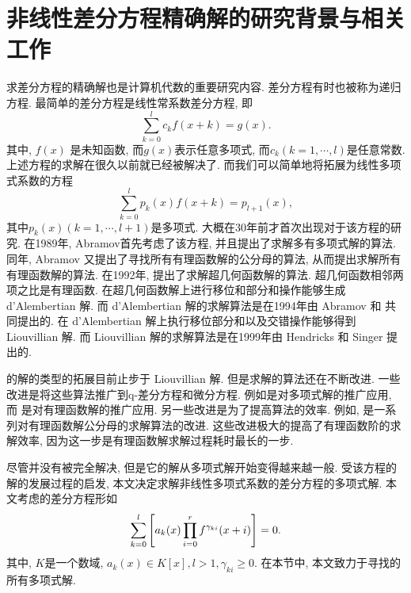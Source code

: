 \section{非线性差分方程精确解的研究背景与相关工作}
求差分方程的精确解也是计算机代数的重要研究内容. 差分方程有时也被称为递归方程. 最简单的差分方程是线性常系数差分方程, 即
\begin{equation}
\sum_{k=0}^l{c_k f(x+k)}=g(x).
\label{ceq}
\end{equation}
其中, $f(x)$ 是未知函数, 而$g(x)$表示任意多项式, 而$c_k (k=1,\cdots,l)$是任意常数. 上述方程的求解在很久以前就已经被解决了. 而我们可以简单地将拓展为线性多项式系数的方程
\begin{equation}
\sum_{k=0}^l{p_k(x)f(x+k)=p_{l+1}(x)},
\label{peq}
\end{equation}
其中$p_k(x) (k=1,\cdots,l+1)$是多项式. 大概在30年前才首次出现对于该方程的研究. 在1989年, Abramov首先考虑了该方程, 并且提出了求解多有多项式解的算法\citep{Abramov1989polynomial}. 同年, Abramov 又提出了寻找所有有理函数解的公分母的算法, 从而提出求解所有有理函数解的算法\citep{Abramov1989rational}. 在1992年, \Petkovsek{} 提出了求解超几何函数解的算法\citep{petkovvsek1992hypergeometric}. 超几何函数相邻两项之比是有理函数. 在超几何函数解上进行移位和部分和操作能够生成 d'Alembertian 解. 而 d'Alembertian 解的求解算法是在1994年由 Abramov 和 \Petkovsek{} 共同提出的\citep{abramov1994dAlembertian}. 在 d'Alembertian 解上执行移位\zdh 部分和以及交错操作能够得到 Liouvillian 解. 而 Liouvillian 解的求解算法是在1999年由 Hendricks 和 Singer 提出的\citep{hendricks1999Liouvillian}.

的解的类型的拓展目前止步于 Liouvillian 解. 但是求解的算法还在不断改进. 一些改进是将这些算法推广到q-差分方程和微分方程. 例如是对多项式解的推广应用, 而 是对有理函数解的推广应用. 另一些改进是为了提高算法的效率. 例如,  是一系列对有理函数解公分母的求解算法的改进. 这些改进极大的提高了有理函数阶的求解效率, 因为这一步是有理函数解求解过程耗时最长的一步. 

尽管并没有被完全解决, 但是它的解从多项式解开始变得越来越一般. 受该方程的解的发展过程的启发, 本文决定求解非线性多项式系数的差分方程的多项式解. 本文考虑的差分方程形如
\begin{equation}
\sum_{k=0}^l{\left[a_k(x)\prod_{i=0}^r{f^{\gamma_{ki}}(x+i)}\right]}=0.
\label{eq}
\end{equation}
其中, $K$是一个数域, $a_k(x)\in K[x], l>1, \gamma_{ki}\ge 0$. 在本节中, 本文致力于寻找的所有多项式解. 

